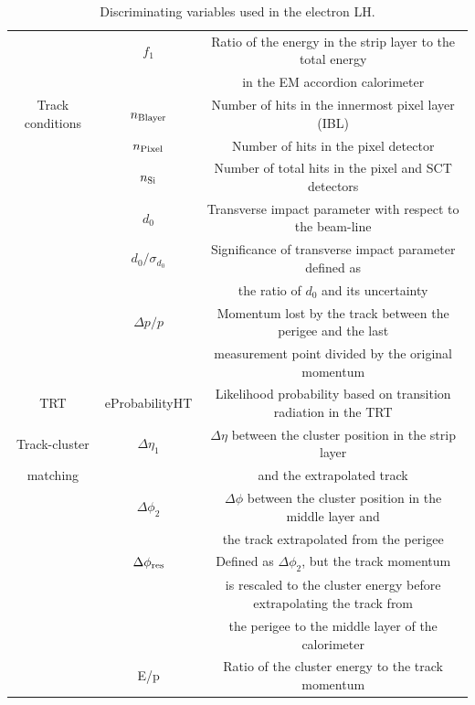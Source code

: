 \begin{table}
\begin{center}
\begin{tabular}{|c|c|c|}
   \cline{2-3}
   &$f_{1}$&Ratio of the energy in the strip layer to the total energy\\
   &&in the EM accordion calorimeter\\
   \hline
   Track conditions & $n_{\rm Blayer}$ & Number of hits in the innermost pixel layer (IBL)\\
   \cline{2-3}
   & $n_{\rm Pixel}$ & Number of hits in the pixel detector\\
   \cline{2-3}
   & $n_{\rm Si}$ & Number of total hits in the pixel and SCT detectors\\
   \cline{2-3}
   & $d_{0}$ & Transverse impact parameter with respect to the beam-line\\
   \cline{2-3}
   &$d_{0}/\sigma_{d_{0}}$& Significance of transverse impact parameter defined as\\
   & & the ratio of $d_{0}$ and its uncertainty\\
   \cline{2-3}
   &$\Delta p /p$&Momentum lost by the track between the perigee and the last\\
   &&measurement point divided by the original momentum\\
   \hline
   TRT& eProbabilityHT& Likelihood probability based on transition radiation in the TRT\\
   \hline
   Track-cluster&$\Delta \eta_{1}$&$\Delta \eta$ between the cluster position in the strip layer\\
   matching&&and the extrapolated track\\
    \cline{2-3}
    &$\Delta \phi_{2}$&$\Delta \phi$ between the cluster position in the middle layer and\\
    && the track extrapolated from the perigee\\
     \cline{2-3}
     &$\Delta \phi_{\rm res}$&Defined as $\Delta \phi_{2}$, but the track momentum\\
     && is rescaled to the cluster energy before extrapolating the track from \\
     &&the perigee to the middle layer of the calorimeter\\
     \cline{2-3}
     & E/p& Ratio of the cluster energy to the track momentum\\     
 \hline\hline
  

\end{tabular}
\captionsetup{width=0.85\textwidth}  \caption{\small Discriminating variables used in the electron LH.}
\label{tab:obj:lep:elevar}
\end{center}
\end{table}
